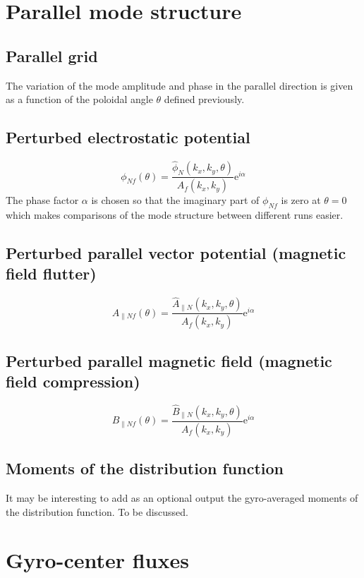 \documentclass[fleqn]{report}
\begin{document}
\section{Parallel mode structure}
\subsection{Parallel grid}
The variation of the mode amplitude and phase in the parallel direction is given as a function of the poloidal angle $\theta$ defined previously.
\subsection{Perturbed electrostatic potential}
$$\phi_{Nf}(\theta) = \frac{\hat{\phi}_N(k_x,k_y,\theta)}{A_f(k_x,k_y)}\textrm{e}^{i\alpha}$$
The phase factor $\alpha$ is chosen so that the imaginary part of $\phi_{Nf}$ is zero at $\theta=0$ which makes comparisons of the mode structure between different runs easier. 
\subsection{Perturbed parallel vector potential (magnetic field flutter)}
$$A_{\parallel Nf}(\theta) = \frac{\hat{A}_{\parallel N}(k_x,k_y,\theta)}{A_f(k_x,k_y)}\textrm{e}^{i\alpha}$$
\subsection{Perturbed parallel magnetic field (magnetic field compression)}
$$B_{\parallel Nf}(\theta) = \frac{\hat{B}_{\parallel N}(k_x,k_y,\theta)}{A_f(k_x,k_y)}\textrm{e}^{i\alpha}$$

\subsection{Moments of the distribution function}
It may be interesting to add as an optional output the gyro-averaged moments of the distribution function. To be discussed.


\section{Gyro-center fluxes}
\end{document}
